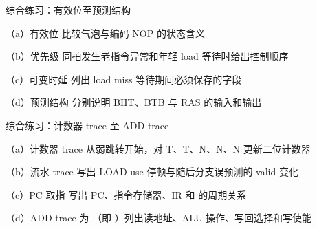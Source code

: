\begin{chapterexercise}{综合练习：有效位至预测结构}
\begin{exercisesubproblem}{（a）有效位}
比较气泡与编码 NOP 的状态含义
\end{exercisesubproblem}
\begin{exercisesubproblem}{（b）优先级}
同拍发生老指令异常和年轻 load 等待时给出控制顺序
\end{exercisesubproblem}
\begin{exercisesubproblem}{（c）可变时延}
列出 load miss 等待期间必须保存的字段
\end{exercisesubproblem}
\begin{exercisesubproblem}{（d）预测结构}
分别说明 BHT、BTB 与 RAS 的输入和输出
\end{exercisesubproblem}
\end{chapterexercise}

\begin{chapterexercise}{综合练习：计数器 trace 至 ADD trace}
\begin{exercisesubproblem}{（a）计数器 trace}
从弱跳转开始，对 T、T、N、N、N 更新二位计数器
\end{exercisesubproblem}
\begin{exercisesubproblem}{（b）流水 trace}
写出 LOAD-use 停顿与随后分支误预测的 valid 变化
\end{exercisesubproblem}
\begin{exercisesubproblem}{（c）PC 取指}
写出 PC、指令存储器、IR 和  的周期关系
\end{exercisesubproblem}
\begin{exercisesubproblem}{（d）ADD trace}
为 （即 ）列出读地址、ALU 操作、写回选择和写使能
\end{exercisesubproblem}
\end{chapterexercise}

